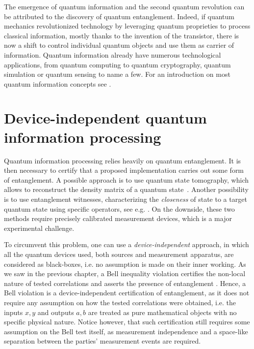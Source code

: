 The emergence of quantum information and the second quantum revolution can be attributed to the discovery of quantum entanglement.
Indeed, if quantum mechanics revolutionized technology by leveraging quantum proprieties to process classical information, mostly thanks to the invention of the transistor, there is now a shift to control individual quantum objects and use them as carrier of information.
Quantum information already have numerous technological applications, from quantum computing to quantum cryptography, quantum simulation or quantum sensing to name a few.
For an introduction on most quantum information concepts see \cite{Nielsen2012}.

\section{Device-independent quantum information processing}

Quantum information processing relies heavily on quantum entanglement.
It is then necessary to certify that a proposed implementation carries out some form of entanglement.
A possible approach is to use quantum state tomography, which allows to reconstruct the density matrix of a quantum state~\cite{MauroDAriano2003}.
Another possibility is to use entanglement witnesses, characterizing the \textit{closeness} of state to a target quantum state using specific operators, see e.g. \cite{Bru2002}.
On the downside, these two methods require precisely calibrated measurement devices, which is a major experimental challenge.

To circumvent this problem, one can use a \textit{device-independent} approach, in which all the quantum devices used, both sources and measurement apparatus, are considered as black-boxes, i.e. no assumption is made on their inner working.
As we saw in the previous chapter, a Bell inequality violation certifies the non-local nature of tested correlations and asserts the presence of entanglement .
Hence, a Bell violation is a device-independent certification of entanglement, as it does not require any assumption on how the tested correlations were obtained, i.e. the inputs $x,y$ and outputs $a,b$ are treated as pure mathematical objects with no specific physical nature.
Notice however, that such certification still requires some assumption on the Bell test itself, as measurement independence and a space-like separation between the parties' measurement events are required.

\medbreak

